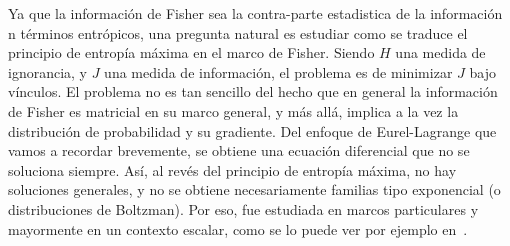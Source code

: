 {\begin{ejemplo}

  \begin{figure}[h!]
  \begin{center}  \end{center}
%
\label{Fig:SZ:BBEFD}
\end{figure}

\end{ejemplo}
%
}




\label{Ssec:SZ:MinFisher}

Ya  que  la informaci\'on  de  Fisher  sea  la  contra-parte estadistica  de  la
informaci\'on n t\'erminos  entr\'opicos, una pregunta natural  es estudiar como
se traduce el principio de entrop\'ia m\'axima en el marco de Fisher. Siendo $H$
una medida de ignorancia,  y $J$ una medida de informaci\'on,  el problema es de
minimizar $J$ bajo v\'inculos.  El problema no  es tan sencillo del hecho que en
general la  informaci\'on de Fisher  es matricial en  su marco general,  y m\'as
all\'a, implica a  la vez la distribuci\'on de probabilidad  y su gradiente. Del
enfoque  de Eurel-Lagrange  que  vamos  a recordar  brevemente,  se obtiene  una
ecuaci\'on  diferencial que  no se  soluciona  siempre.  As\'i,  al rev\'es  del
principio de entrop\'ia  m\'axima, no hay soluciones generales, y  no se obtiene
necesariamente familias  tipo exponencial  (o distribuciones de  Boltzman).  Por
eso, fue estudiada  en marcos particulares y mayormente en  un contexto escalar,
como se lo puede ver por ejemplo en~\cite{Fri98, Fri04}.

